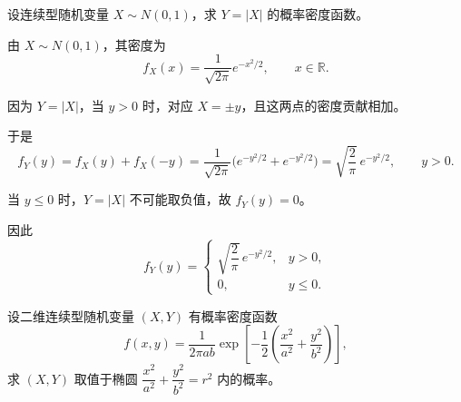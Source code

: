\begin{homework}[45]
设连续型随机变量 $X \sim N(0,1)$，求 $Y=|X|$ 的概率密度函数。
\end{homework}
\begin{solution}
由 $X\sim N(0,1)$，其密度为
\[
f_X(x)=\frac{1}{\sqrt{2\pi}}e^{-x^2/2},\qquad x\in\mathbb{R}.
\]

因为 $Y=|X|$，当 $y>0$ 时，对应 $X=\pm y$，且这两点的密度贡献相加。

于是
\[
f_Y(y)=f_X(y)+f_X(-y)
=\frac{1}{\sqrt{2\pi}}\big(e^{-y^2/2}+e^{-y^2/2}\big)
=\sqrt{\frac{2}{\pi}}\,e^{-y^2/2},\qquad y>0.
\]

当 $y\le0$ 时，$Y=|X|$ 不可能取负值，故 $f_Y(y)=0$。

因此
\[
f_Y(y)=
\begin{cases}
\sqrt{\dfrac{2}{\pi}}\,e^{-y^2/2}, & y>0,\\[6pt]
0, & y\le0.
\end{cases}
\]
\end{solution}
\begin{homework}[50]
设二维连续型随机变量 $(X,Y)$ 有概率密度函数
\[
f(x,y)=\frac{1}{2\pi ab}\exp\!\left[-\frac{1}{2}\left(\frac{x^2}{a^2}+\frac{y^2}{b^2}\right)\right],
\]
求 $(X,Y)$ 取值于椭圆 $\dfrac{x^2}{a^2}+\dfrac{y^2}{b^2}=r^2$ 内的概率。
\end{homework}

